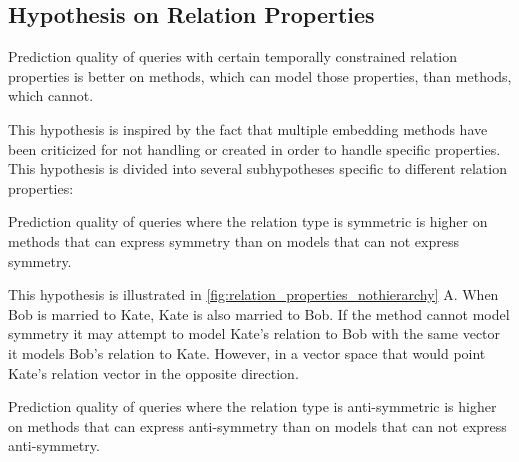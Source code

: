 \subsection{Hypothesis on Relation Properties}
\label{sec:hypothesis_relation_properties}



\begin{hypothesis}
\label{hyp:relation_properties}
Prediction quality of queries with certain temporally constrained relation properties is better on methods, which can model those properties, than methods, which cannot.
\end{hypothesis}

This hypothesis is inspired by the fact that multiple embedding methods have been criticized for not handling or created in order to handle specific properties.
\missing[Examples]
This hypothesis is divided into several subhypotheses specific to different relation properties:

\begin{subhypothesis}
Prediction quality of queries where the relation type is symmetric is higher on methods that can express symmetry than on models that can not express symmetry.
\end{subhypothesis}

This hypothesis is illustrated in \autoref{fig:relation_properties_nothierarchy} A. When Bob is married to Kate, Kate is also married to Bob. If the method cannot model symmetry it may attempt to model Kate's relation to Bob with the same vector it models Bob's relation to Kate. However, in a vector space that would point Kate's relation vector in the opposite direction.

\begin{subhypothesis}
Prediction quality of queries where the relation type is anti-symmetric is higher on methods that can express anti-symmetry than on models that can not express anti-symmetry.
\end{subhypothesis}

